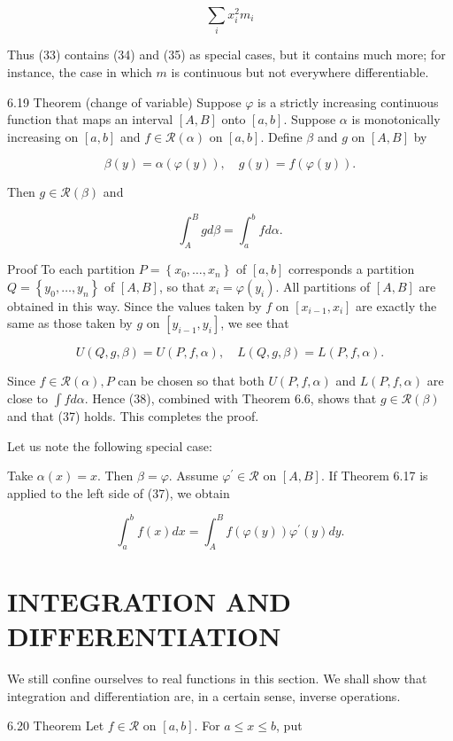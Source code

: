 \documentclass[10pt]{article}
\begin{document}
$$
\sum_{i} x_{i}^{2} m_{i}
$$

Thus (33) contains (34) and (35) as special cases, but it contains much more; for instance, the case in which $m$ is continuous but not everywhere differentiable.

6.19 Theorem (change of variable) Suppose $\varphi$ is a strictly increasing continuous function that maps an interval $[A, B]$ onto $[a, b]$. Suppose $\alpha$ is monotonically increasing on $[a, b]$ and $f \in \mathscr{R}(\alpha)$ on $[a, b]$. Define $\beta$ and $g$ on $[A, B]$ by

$$
\beta(y)=\alpha(\varphi(y)), \quad g(y)=f(\varphi(y)) .
$$

Then $g \in \mathscr{R}(\beta)$ and

$$
\int_{A}^{B} g d \beta=\int_{a}^{b} f d \alpha .
$$

Proof To each partition $P=\left\{x_{0}, \ldots, x_{n}\right\}$ of $[a, b]$ corresponds a partition $Q=\left\{y_{0}, \ldots, y_{n}\right\}$ of $[A, B]$, so that $x_{i}=\varphi\left(y_{i}\right)$. All partitions of $[A, B]$ are obtained in this way. Since the values taken by $f$ on $\left[x_{i-1}, x_{i}\right]$ are exactly the same as those taken by $g$ on $\left[y_{i-1}, y_{i}\right]$, we see that

$$
U(Q, g, \beta)=U(P, f, \alpha), \quad L(Q, g, \beta)=L(P, f, \alpha) .
$$

Since $f \in \mathscr{R}(\alpha), P$ can be chosen so that both $U(P, f, \alpha)$ and $L(P, f, \alpha)$ are close to $\int f d \alpha$. Hence (38), combined with Theorem 6.6, shows that $g \in \mathscr{R}(\beta)$ and that (37) holds. This completes the proof.

Let us note the following special case:

Take $\alpha(x)=x$. Then $\beta=\varphi$. Assume $\varphi^{\prime} \in \mathscr{R}$ on $[A, B]$. If Theorem 6.17 is applied to the left side of (37), we obtain

$$
\int_{a}^{b} f(x) d x=\int_{A}^{B} f(\varphi(y)) \varphi^{\prime}(y) d y .
$$

\section{INTEGRATION AND DIFFERENTIATION}
We still confine ourselves to real functions in this section. We shall show that integration and differentiation are, in a certain sense, inverse operations.

6.20 Theorem Let $f \in \mathscr{R}$ on $[a, b]$. For $a \leq x \leq b$, put
\end{document}
